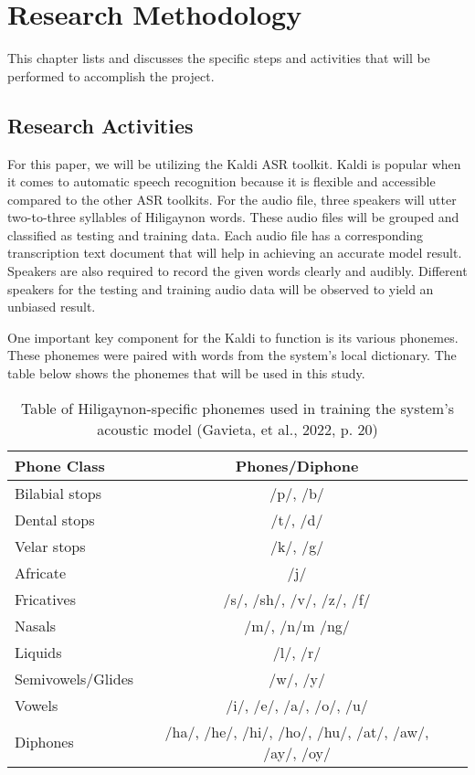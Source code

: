 \chapter{Research Methodology}
This chapter lists and discusses the specific steps and activities that will be performed to accomplish the project.

\section{Research Activities}
For this paper, we will be utilizing the Kaldi ASR toolkit. Kaldi is popular when it comes to automatic speech recognition because it is flexible and accessible compared to the other ASR toolkits. For the audio file, three speakers will utter two-to-three syllables of Hiligaynon words. These audio files will be grouped and classified as testing and training data. Each audio file has a corresponding transcription text document that will help in achieving an accurate model result. Speakers are also required to record the given words clearly and audibly. Different speakers for the testing and training audio data will be observed to yield an unbiased result.

One important key component for the Kaldi to function is its various phonemes. These phonemes were paired with words from the system’s local dictionary. The table below shows the phonemes that will be used in this study.

\begin{table}[h]   %
	\setlength{\extrarowheight}{2pt}
	\setlength{\tabcolsep}{0.2em}
	\centering
	\caption{Table of Hiligaynon-specific phonemes used in training the system's acoustic model (Gavieta, et al., 2022, p. 20)} \vspace{0.25em}
	\begin{tabular}{|p{2in}|c|c|} \hline
		\centering Phone Class & Phones/Diphone \\ \hline
		Bilabial stops & /p/, /b/ \\ \hline
		Dental stops & /t/, /d/ \\ \hline
		Velar stops & /k/, /g/  \\ \hline
		Africate & /j/ \\ \hline
		Fricatives & /s/, /sh/, /v/, /z/, /f/  \\ \hline
		Nasals & /m/, /n/m /ng/  \\ \hline
		Liquids & /l/, /r/ \\ \hline
		Semivowels/Glides & /w/, /y/  \\ \hline
		Vowels & /i/, /e/, /a/, /o/, /u/ \\ \hline
		Diphones & /ha/, /he/, /hi/, /ho/, /hu/, /at/, /aw/, /ay/, /oy/ \\ \hline
		
		
	\end{tabular}
	\label{tab:phoneme-hiligaynon}
\end{table}


